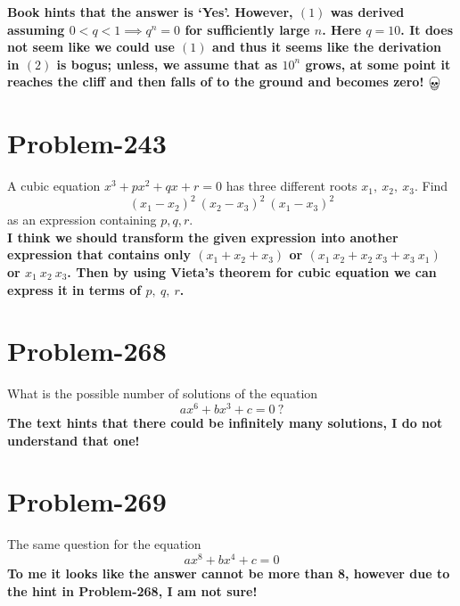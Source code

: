 \documentclass[12pt]{article}
\begin{document}
\textbf{Book hints that the answer is `Yes'. However, $(1)$ was derived assuming $0 < q < 1 \implies q^n = 0$ for sufficiently large $n$. Here $q = 10$. It does not seem like we could use $(1)$ and thus it seems like the derivation in $(2)$ is bogus; unless, we assume that as $10^n$ grows, at some point it reaches the cliff and then falls of to the ground and becomes zero! $\bigskull$}

\section*{Problem-243}
A cubic equation $x^3 + px^2 + qx +r = 0$ has three different roots $x_1,\ x_2,\ x_3$. Find
\[
	(x_1 - x_2)^2\ (x_2 - x_3)^2\ (x_1 - x_3)^2
\]
as an expression containing $p, q, r$.\\

\textbf{I think we should transform the given expression into another expression that contains only $(x_1 + x_2 + x_3)$ or $(x_1\ x_2 + x_2\ x_3 + x_3\ x_1)$ or $x_1\ x_2\ x_3$. Then by using Vieta's theorem for cubic equation we can express it in terms of $p,\ q,\ r$.}

\section*{Problem-268}
What is the possible number of solutions of the equation
\[
	ax^6 + bx^3 + c = 0\ ?
\]
\textbf{The text hints that there could be infinitely many solutions, I do not understand that one!}

\section*{Problem-269}
The same question for the equation
\[
	ax^8 + bx^4 + c = 0
\]
\textbf{To me it looks like the answer cannot be more than 8, however due to the hint in Problem-268, I am not sure!}
\end{document}
